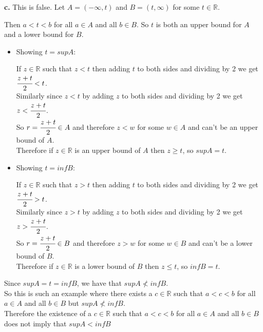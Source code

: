\documentclass{article}
\begin{document}
{\Large \textbf{c.}} This is false. Let $A = (-\infty, t)$ and $B = (t, \infty)$ for some $t\in\mathbb{R}$.
\begin{center}
    \doublespacing
    Then $a < t < b$ for all $a\in A$ and all $b\in B$. So $t$ is both an upper bound for $A$ and a lower bound for $B$.
    \begin{itemize}
        \item Showing $t = sup A$:
        \begin{center}
            If $z\in\mathbb{R}$ such that $z < t$ then adding $t$ to both sides and dividing by 2 we get $\cfrac{z + t}{2} < t$.
            \\Similarly since $z < t$ by adding $z$ to both sides and dividing by 2 we get $z < \cfrac{z + t}{2}$.
            \\So $r = \cfrac{z + t}{2}\in A$ and therefore $z < w$ for some $w\in A$ and can't be an upper bound of $A$.
            \\Therefore if $z\in\mathbb{R}$ is an upper bound of $A$ then $z\geq t$, so $sup A = t$.
        \end{center}
        \item Showing $t = inf B$:
        \begin{center}
            If $z\in\mathbb{R}$ such that $z > t$ then adding $t$ to both sides and dividing by 2 we get $\cfrac{z + t}{2} > t$.
            \\Similarly since $z > t$ by adding $z$ to both sides and dividing by 2 we get $z > \cfrac{z + t}{2}$.
            \\So $r = \cfrac{z + t}{2}\in B$ and therefore $z > w$ for some $w\in B$ and can't be a lower bound of $B$.
            \\Therefore if $z\in\mathbb{R}$ is a lower bound of $B$ then $z\leq t$, so $inf B = t$.
        \end{center}
    \end{itemize}
    Since $sup A = t = inf B$, we have that $sup A\not < inf B$.
    \\So this is such an example where there exists a $c\in\mathbb{R}$ such that $a < c < b$ for all $a\in A$ and all $b\in B$ but $sup A\not < inf B$.
    \\Therefore the existence of a $c\in\mathbb{R}$ such that $a < c < b$ for all $a\in A$ and all $b\in B$ does not imply that $sup A < inf B$ \qedsymbol
\end{center}

\newpage
\end{document}
